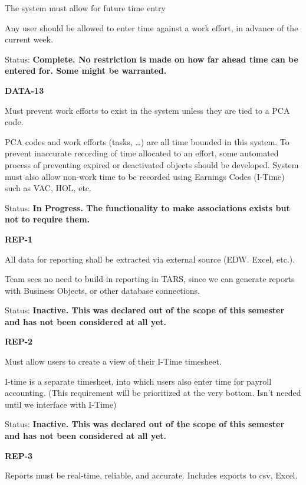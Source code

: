 \documentclass{article}
\begin{document}
\noindent The system must allow for future time entry

Any user should be allowed to enter time against a work effort, in advance of the current week.

Status: \textbf{Complete.  No restriction is made on how far ahead time can be entered for.  Some  might be warranted.}

\noindent \textit{}


\noindent \textbf{DATA-13}

\noindent Must prevent work efforts to exist in the system unless they are tied to a PCA code.

\noindent PCA codes and work efforts (tasks, \dots ) are all time bounded in this system. To prevent inaccurate recording of time allocated to an effort, some automated process of preventing expired or deactivated objects should be developed. System must also allow non-work time to be recorded using Earnings Codes (I-Time) such as VAC, HOL, etc.

\noindent Status: \textbf{In Progress.  The functionality to make associations exists but not to require them.}

\noindent \textit{}


\noindent \textbf{REP-1}

\noindent All data for reporting shall be extracted via external source (EDW. Excel, etc.).

\noindent Team sees no need to build in reporting in TARS, since we can generate reports with Business Objects, or other database connections. 

\noindent Status: \textbf{Inactive.   This was declared out of the scope of this semester and has not been considered at all yet.}

\noindent \textit{}


\noindent \textbf{REP-2}

\noindent Must allow users to create a view of their I-Time timesheet.

I-time is a separate timesheet, into which users also enter time for payroll accounting. (This requirement will be prioritized at the very bottom.  Isn't needed until we interface with I-Time)

\noindent Status: \textbf{Inactive.   This was declared out of the scope of this semester and has not been considered at all yet.}

\noindent \textit{}

  
\noindent \textbf{REP-3}

\noindent Reports must be real-time, reliable, and accurate. Includes exports to csv, Excel.
\end{document}
